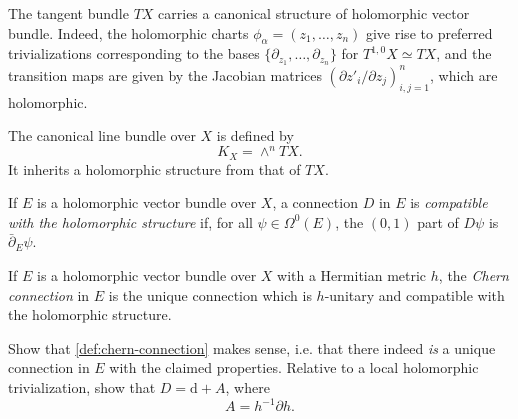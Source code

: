 \documentclass[12pt,letterpaper,reqno]{article}
\numberwithin{equation}{section}
\newcommand{\C}{\ensuremath{\mathbb C}}
\newcommand{\de}{\mathrm{d}}
\newcommand{\ti}[1]{\textit{#1}}
\begin{document}
\begin{example} The tangent bundle $TX$ carries
a canonical structure of holomorphic vector bundle.
Indeed, the holomorphic charts $\phi_\alpha = (z_1, \dots, z_n)$
give rise to preferred trivializations corresponding
to the bases $\{\partial_{z_1}, \dots, \partial_{z_n} \}$
for $T^{1,0} X \simeq TX$, and the transition
maps are given by the Jacobian matrices
$(\partial z'_i / \partial z_j)_{i,j=1}^n$, which are holomorphic.
\end{example}

\begin{example} The canonical line bundle over $X$
is defined by
\begin{equation}
  K_X = \wedge^n TX.
\end{equation}
It inherits a holomorphic structure from that of $TX$.
\end{example}

\begin{defn}
If $E$ is a holomorphic vector bundle over $X$,
a connection $D$ in $E$ is \ti{compatible with the
holomorphic structure} if, for all
$\psi \in \Omega^0(E)$, the $(0,1)$ part of $D \psi$
is $\bar\partial_E \psi$.
\end{defn}

\begin{defn} \label{def:chern-connection}
If $E$ is a holomorphic vector bundle over $X$ with
a Hermitian metric $h$, the \ti{Chern connection}
in $E$ is the unique connection which is
$h$-unitary and compatible with the holomorphic
structure.
\end{defn}

\begin{exercise} Show that \autoref{def:chern-connection} makes
sense, i.e. that there indeed \ti{is} a unique
connection in $E$ with the claimed properties.
Relative to a local holomorphic trivialization, show
that $D = \de + A$,
where
\begin{equation} \label{eq:chern-connection-local-holomorphic}
  A = h^{-1} \partial h.
\end{equation}

\end{exercise}
\end{document}
